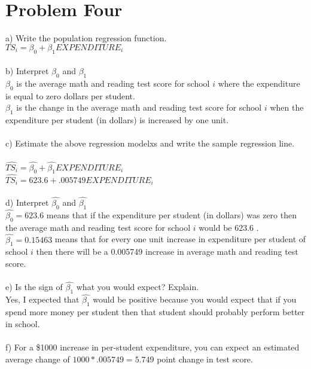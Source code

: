 \documentclass[11pt, oneside]{article}   	%
\begin{document}
\section{Problem Four}
a) Write the population regression function.\\
$TS_i = \beta_0 + \beta_1 EXPENDITURE_i$\\~\\
b) Interpret $\beta_0$ and $\beta_1$\\
$\beta_0$ is the average math and reading test score for school $i$ where the expenditure is equal to zero dollars per student.\\
$\beta_1$ is the change in the average math and reading test score for school $i$ when the expenditure per student (in dollars) is increased by one unit.\\~\\
c) Estimate the above regression modelxs and write the sample regression line.\\~\\
$\widehat{TS_i} = \hat{\beta_0} + \hat{\beta_1} EXPENDITURE_i$\\
$\widehat{TS_i} = 623.6 + .005749 EXPENDITURE_i$\\~\\
d) Interpret $\hat{\beta_0}$ and $\hat{\beta_1}$ \\
$\hat{\beta_0} = 623.6 $ means that if the expenditure per student (in dollars) was zero then the average math and reading test score for school $i$ would be 623.6 .\\
$\hat{\beta_1} = 0.15463$ means that for every one unit increase in expenditure per student of school $i$ then there will be a 0.005749 increase in average math and reading test score.\\~\\
e) Is the sign of $\hat{\beta_1}$ what you would expect? Explain.\\
Yes, I expected that $\hat{\beta_1}$ would be positive because you would expect that if you spend more money per student then that student should probably perform better in school.\\~\\
f) For a \$1000 increase in per-student expenditure, you can expect an estimated average change of $1000 * .005749 = 5.749$ point change in test score.\\
\end{document}
